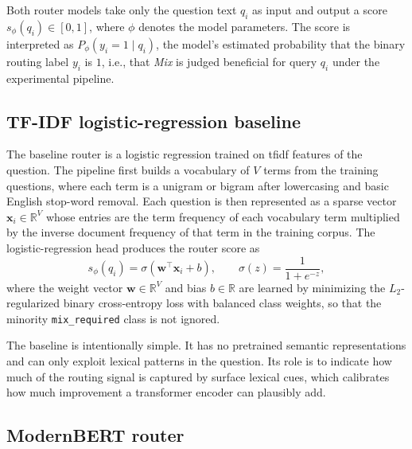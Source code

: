 \documentclass[english, bibtex]{kththesis}               %
\numberwithin{listing}{chapter}
\begin{document}
Both router models take only the question text $q_i$ as input and output a score \(s_\phi(q_i) \in [0,1]\), where $\phi$ denotes the model parameters. The score is interpreted as $P_\phi(y_i = 1 \mid q_i)$, the model's estimated probability that the binary routing label $y_i$ is $1$, i.e., that \emph{Mix} is judged beneficial for query $q_i$ under the experimental pipeline.

\subsection{TF-IDF logistic-regression baseline}
\label{sec:methodTfidf}

The baseline router is a logistic regression trained on \gls{tfidf} features of the question. The pipeline first builds a vocabulary of \(V\) terms from the training questions, where each term is a unigram or bigram after lowercasing and basic English stop-word removal. Each question is then represented as a sparse vector \(\mathbf{x}_i \in \mathbb{R}^{V}\) whose entries are the term frequency of each vocabulary term multiplied by the inverse document frequency of that term in the training corpus. The logistic-regression head produces the router score as
\begin{equation}
\label{eq:tfidfScore}
s_\phi(q_i) = \sigma(\mathbf{w}^\top \mathbf{x}_i + b),
\qquad
\sigma(z) = \frac{1}{1 + e^{-z}},
\end{equation}
where the weight vector \(\mathbf{w} \in \mathbb{R}^{V}\) and bias \(b \in \mathbb{R}\) are learned by minimizing the $L_2$-regularized binary cross-entropy loss with balanced class weights, so that the minority \texttt{mix\_required} class is not ignored.

The baseline is intentionally simple. It has no pretrained semantic representations and can only exploit lexical patterns in the question. Its role is to indicate how much of the routing signal is captured by surface lexical cues, which calibrates how much improvement a transformer encoder can plausibly add.

\subsection{ModernBERT router}
\label{sec:methodModernBert}
\end{document}
